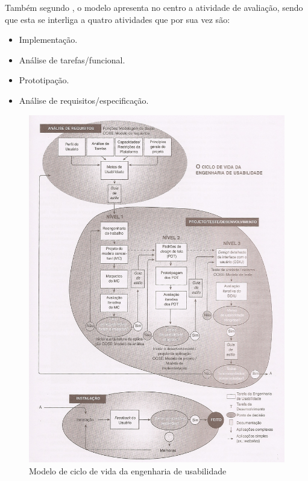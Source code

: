        Também segundo \cite{guiaderef}, o modelo apresenta no centro a atividade de avaliação, sendo que esta se interliga a quatro atividades que 
       por sua vez são:
       
       \begin{itemize}
       \item Implementação.

       \item Análise de tarefas/funcional.

       \item Prototipação.
       
       \item Análise de requisitos/especificação.
       
       \end{itemize}
       
\begin{figure}[!htb]
\centering
\includegraphics[scale=0.6]{figuras/ciclovidaengusabilidade.jpg}
\caption{Modelo de ciclo de vida da engenharia de usabilidade}
\end{figure}

